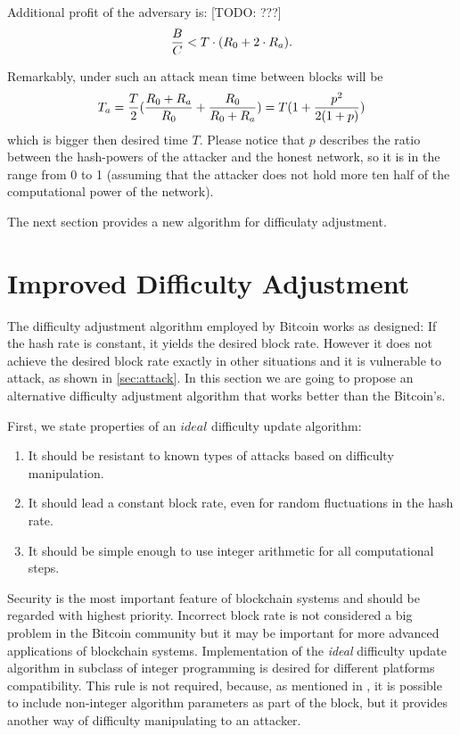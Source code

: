 \documentclass[number,preprint,review]{elsarticle}
\begin{document}
Additional profit of the adversary is:
[TODO: ???]
\begin{equation}
{{B\over C} < T\cdot (R_0+2\cdot R_a)}.
\end{equation}



Remarkably, under such an attack mean time between blocks will be
\begin{equation}
\label{eq:ati}
{T_a={T\over 2}({R_0+R_a\over R_0} + {R_0\over R_0+R_a})=T(1 + {p^2\over 2(1+p)})}
\end{equation}
which is bigger then desired time \(T\).
Please notice that \(p\) describes the ratio between the hash-powers of the attacker and the honest network, so it is in the range from 0 to 1 (assuming that the attacker does not hold more ten half of the computational power of the network).

The next section provides a new algorithm for difficulaty adjustment.

\section{Improved Difficulty Adjustment}
\label{sec:improved}

The difficulty adjustment algorithm employed by Bitcoin works as designed: If the hash rate is constant, it yields the desired block rate. However it does not achieve the desired block rate exactly in other situations and it is vulnerable to attack, as shown in \ref{sec:attack}.
In this section we are going to propose an alternative difficulty adjustment algorithm that works better than the Bitcoin's.

First, we state properties of an \(ideal\) difficulty update algorithm:
\begin{enumerate}
\item{It should be resistant to known types of attacks based on difficulty manipulation.}
\item{It should lead a constant block rate, even for random fluctuations in the hash rate.}
\item{It should be simple enough to use integer arithmetic for all computational steps.}
\end{enumerate}

Security is the most important feature of blockchain systems and should be regarded with highest priority.
Incorrect block rate is not considered a big problem in the Bitcoin community but it may be important for more advanced applications of blockchain systems.
Implementation of the \textit{ideal} difficulty update algorithm in subclass of integer programming is desired for different platforms compatibility.
This rule is not required, because, as mentioned in \cite{kraft2015difficulty}, it is possible to include non-integer algorithm parameters as part of the block, but it provides another way of difficulty manipulating to an attacker.
\end{document}
